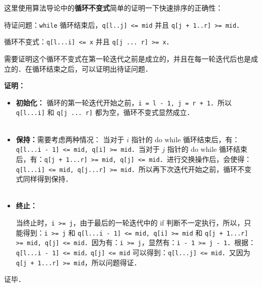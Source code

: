 这里使用算法导论中的\textbf{循环不变式}简单的证明一下快速排序的正确性：

待证问题：\verb|while| 循环结束后，\verb|q[l..j] <= mid| 并且 \verb|q[j + 1..r] >= mid|．

循环不变式：\verb|q[l...i] <= x| 并且 \verb|q[j ... r] >= x|．

需要证明这个循环不变式在第一轮迭代之前是成立的，并且在每一轮迭代后也是成立的．在循环结束之后，可以证明出待证问题．

\textbf{证明：}
\begin{itemize}
\item 

\textbf{初始化：} 循环的第一轮迭代开始之前，\verb|i = l - 1, j = r + 1|．所以 \verb|q[l...i]| 和 \verb|q[j ... r]| 都为空，循环不变式显然成立．\\\\

\item \textbf{保持：}需要考虑两种情况：
当对于 $i$ 指针的 $\text{do while}$ 循环结束后，有：\verb|q[l...i - 1] <= mid, q[i] >= mid|．当对于 $j$ 指针的 $\text{do while}$ 循环结束后，有：\verb|q[j + 1...r] >= mid, q[j] <= mid|．进行交换操作后，会使得：\verb|q[l...i] <= mid, q[j...r] >= mid|．所以再下次迭代开始之前，循环不变式同样得到保持．\\\\

\item \textbf{终止：}

当终止时，\verb|i >= j|，由于最后的一轮迭代中的 if 判断不一定执行，所以，只能得到：\verb|i >= j| 和 \verb|q[l...i - 1] <= mid, q[i] >= mid| 和 \verb|q[j + 1...r] >= mid, q[j] <= mid|．因为有：\verb|i >= j|，显然有：\verb|i - 1 >= j - 1|．根据：\verb|q[l...i - 1] <= mid，q[j] <= mid| 可以得到：\verb|q[l...j] <= mid|．又因为 \verb|q[j + 1...r] >= mid|，所以问题得证．

\end{itemize}

证毕．